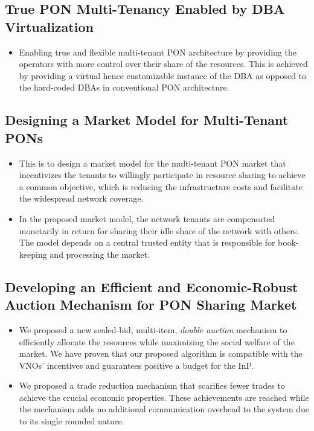 \subsection{True \ac{PON} Multi-Tenancy Enabled by \ac{DBA} Virtualization}
\begin{itemize}

\item Enabling true and flexible multi-tenant \ac{PON} architecture by providing the operators with more control over their share of the resources. This is achieved by providing a virtual hence customizable instance of the \ac{DBA} as opposed to the hard-coded \acp{DBA} in conventional \ac{PON} architecture.


\end{itemize}
\subsection{Designing a Market Model for Multi-Tenant \ac{PON}s}
\begin{itemize}

\item This is to design a market model for the multi-tenant \ac{PON} market that incentivizes the tenants to willingly participate in resource sharing to achieve a common objective, which is reducing the infrastructure costs and facilitate the widespread network coverage.

\item In the proposed market model, the network tenants are compensated monetarily in return for sharing their idle share of the network with others. The model depends on a central trusted entity that is responsible for book-keeping and processing the market.


\end{itemize}
\subsection{Developing an Efficient and Economic-Robust Auction Mechanism for \ac{PON} Sharing Market}
\begin{itemize}


\item We proposed a new sealed-bid, multi-item, \textit{double auction} mechanism to efficiently allocate the resources while maximizing the social welfare of the market. We have proven that our proposed algorithm is compatible with the VNOs' incentives and guarantees positive a budget for the InP.


\item We proposed a trade reduction mechanism that scarifies fewer trades to achieve the crucial economic properties. These achievements are reached while the mechanism adds no additional communication overhead to the system due to its single rounded nature.


\end{itemize}

